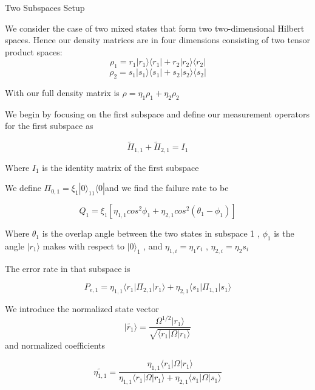 \documentclass{beamer}
\newcommand{\br}[1]{\langle #1|}
\newcommand{\ke}[1]{|#1\rangle}
\begin{document}
\begin{frame}{Two Subspaces Setup}

We consider the case of two mixed states that form two two-dimensional Hilbert spaces. Hence our density matrices are in four dimensions consisting of two tensor product spaces:
\[ \rho_1 = r_1 \vert r_1 \rangle \langle r_1 \vert  + r_2 \vert r_2 \rangle \langle r_2 \vert\]
\[ \rho_2 = s_1 \vert s_1 \rangle \langle s_1 \vert  + s_2 \vert s_2 \rangle \langle s_2 \vert\]

With our full density matrix is $ \rho = \eta_1 \rho_1 + \eta_2 \rho_2$

We begin by focusing on the first subspace and define our measurement operators for the first subspace as

\[ \widetilde \Pi_{1,1} + \widetilde \Pi_{2,1} = I_1\]

Where $I_1$ is the identity matrix of the first subspace
\end{frame}
\begin{frame}
We define $\Pi_{0,1} = \xi_1 \ke 0_{11} \br 0 $and we find the failure rate to be

\[ Q_1 = \xi_1 [ \eta_{1,1} cos^2 \phi_1 + \eta_{2,1} cos^2 (\theta_1 - \phi_1)]\]

Where $\theta_1 $ is the overlap angle between the two states in subspace 1 , $\phi_1$ is the angle $\ke {r_1}$ makes with respect to $\vert 0 \rangle_1$ , and $\eta_{1,i} = \eta_1 r_i$  , $\eta_{2,i} = \eta_2 s_i$

\end{frame}
\begin{frame}
The error rate in that subspace is

\[P_{e,1} = \eta_{1,1} \langle r_1 \vert \Pi_{2,1} \vert r_1 \rangle + \eta_{2,1} \langle s_1 \vert \Pi_{1,1} \vert s_1 \rangle \]

We introduce the normalized state vector \[ \vert \widetilde{r_1} \rangle  = \frac{ \Omega^{1/2} \vert r_1 \rangle}{\sqrt{\langle r_1 \vert \Omega \vert r_1 \rangle}} \]
and normalized coefficients

\[ \widetilde{\eta_{1,1}} = \frac{\eta_{1,1} \langle r_1 \vert \Omega \vert r_1 \rangle}{\eta_{1,1} \langle r_1 \vert \Omega \vert r_1 \rangle + \eta_{2,1} \langle s_1 \vert \Omega \vert s_1 \rangle}\]
\end{frame}
\end{document}
